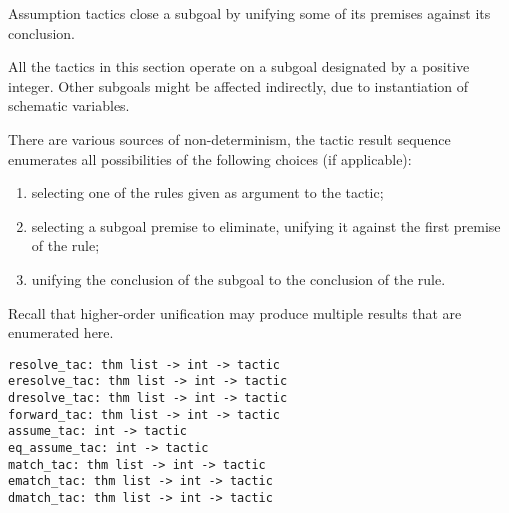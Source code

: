 \begin{isabellebody}
\begin{isamarkuptext}
  Assumption tactics close a subgoal by unifying some of its premises
  against its conclusion.

  \medskip All the tactics in this section operate on a subgoal
  designated by a positive integer.  Other subgoals might be affected
  indirectly, due to instantiation of schematic variables.

  There are various sources of non-determinism, the tactic result
  sequence enumerates all possibilities of the following choices (if
  applicable):

  \begin{enumerate}

  \item selecting one of the rules given as argument to the tactic;

  \item selecting a subgoal premise to eliminate, unifying it against
  the first premise of the rule;

  \item unifying the conclusion of the subgoal to the conclusion of
  the rule.

  \end{enumerate}

  Recall that higher-order unification may produce multiple results
  that are enumerated here.%
\end{isamarkuptext}%
\isamarkuptrue%
%
\isadelimmlref
%
\endisadelimmlref
%
\isatagmlref
%
\begin{isamarkuptext}%
\begin{mldecls}
  \verb|resolve_tac: thm list -> int -> tactic| \\
  \verb|eresolve_tac: thm list -> int -> tactic| \\
  \verb|dresolve_tac: thm list -> int -> tactic| \\
  \verb|forward_tac: thm list -> int -> tactic| \\[1ex]
  \verb|assume_tac: int -> tactic| \\
  \verb|eq_assume_tac: int -> tactic| \\[1ex]
  \verb|match_tac: thm list -> int -> tactic| \\
  \verb|ematch_tac: thm list -> int -> tactic| \\
  \verb|dmatch_tac: thm list -> int -> tactic| \\
  \end{mldecls}


\end{isamarkuptext}
\end{isabellebody}
